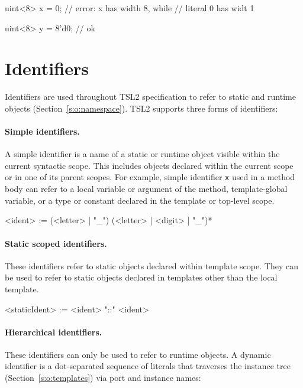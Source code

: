 \documentclass{report}
\newcommand{\src}[1]{\texttt{#1}}
\newcommand{\tsl}{TSL2 }
\begin{document}
\begin{tsllisting}{}
uint<8> x = 0; // error: x has width 8, while
               // literal 0 has widt 1

uint<8> y = 8'd0; // ok
\end{tsllisting}


\section{Identifiers}\label{s:r:identifiers}

Identifiers are used throughout \tsl specification to refer to 
static and runtime objects (Section~\ref{s:o:namespace}).  \tsl 
supports three forms of identifiers:

\paragraph{Simple identifiers.}  A simple identifier is a name of 
a static or runtime object visible within the current syntactic 
scope.  This includes objects declared within the current scope or 
in one of its parent scopes.  For example, simple identifier 
\src{x} used in a method body can refer to a local variable or 
argument of the method, template-global variable, or a type or 
constant declared in the template or top-level scope.

\begin{bnflisting}{}
<ident> := (<letter> | "_") (<letter> | <digit> | "_")*
\end{bnflisting}

\paragraph{Static scoped identifiers.} These identifiers refer to 
static objects declared within template scope.  They can be used 
to refer to static objects declared in templates other than the 
local template.

\begin{bnflisting}{}
<staticIdent> := <ident> "::" <ident>
\end{bnflisting}

\paragraph{Hierarchical identifiers.}  These identifiers can only 
be used to refer to runtime objects.  A dynamic identifier is a 
dot-separated sequence of literals that traverses the instance 
tree (Section~\ref{s:o:templates}) via port and instance names:
\end{document}

